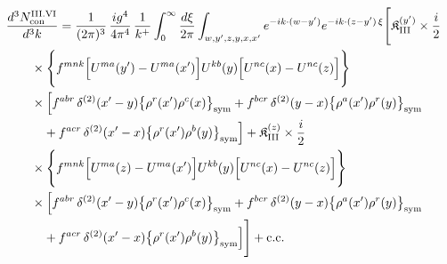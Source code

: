 \begingroup\small
\begin{align}\label{eq:H-III.VI-2}
&\frac{d^{3}N^{\rm III.VI}_{{\rm con}}}{d^{3}k}=\frac{1}{(2\pi)^{3}}\, \frac{ig^{4}}{4\pi^{4}}\, \frac{1}{k^{+}} \int_{0}^{\infty}\frac{d\xi}{2\pi} \int_{w,y',z,y,x,x'}e^{-ik\cdot(w-y')}e^{-ik\cdot(z-y')\,\xi}\Bigg[ \mathfrak{K}^{(y')}_{\rm III} \times \frac{i}{2}\notag\\
&\quad\quad \times \Bigg\{f^{mnk}\Big[U^{ma}(y')-U^{ma}(x')\Big]U^{kb}(y)\Big[U^{nc}(x)-U^{nc}(z)\Big]\Bigg\}\notag\\
&\quad\quad \times\Big[f^{abr}\, \delta^{(2)}(x'-y)\big\{\rho^{r}(x')\rho^{c}(x)\big\}_{\rm sym} +f^{bcr}\, \delta^{(2)}(y-x)\big\{\rho^{a}(x')\rho^{r}(y)\big\}_{\rm sym}\notag\\
&\quad\quad\quad +f^{acr}\, \delta^{(2)}(x'-x)\big\{\rho^{r}(x')\rho^{b}(y)\big\}_{\rm sym}\Big] + \mathfrak{K}^{(z)}_{\rm III} \times \frac{i}{2}\notag\\
&\quad\quad \times \Bigg\{f^{mnk}\Big[U^{ma}(z)-U^{ma}(x')\Big]U^{kb}(y)\Big[U^{nc}(x)-U^{nc}(z)\Big]\Bigg\}\notag\\
&\quad\quad \times\Big[f^{abr}\, \delta^{(2)}(x'-y)\big\{\rho^{r}(x')\rho^{c}(x)\big\}_{\rm sym} +f^{bcr}\, \delta^{(2)}(y-x)\big\{\rho^{a}(x')\rho^{r}(y)\big\}_{\rm sym}\notag\\
&\quad\quad\quad +f^{acr}\, \delta^{(2)}(x'-x)\big\{\rho^{r}(x')\rho^{b}(y)\big\}_{\rm sym}\Big]\Bigg] +{\rm c.c.}
\end{align}
\endgroup
